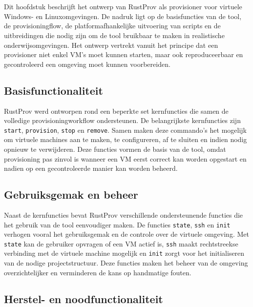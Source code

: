 \chapter{}%
\label{ch:ontwerp}

Dit hoofdstuk beschrijft het ontwerp van RustProv als provisioner voor virtuele Windows- en Linuxomgevingen. De nadruk ligt op de basisfuncties van de tool, de provisioningflow, de platformafhankelijke uitvoering van scripts en de uitbreidingen die nodig zijn om de tool bruikbaar te maken in realistische onderwijsomgevingen. Het ontwerp vertrekt vanuit het principe dat een provisioner niet enkel VM's moet kunnen starten, maar ook reproduceerbaar en gecontroleerd een omgeving moet kunnen voorbereiden. 
\section{Basisfunctionaliteit}

RustProv werd ontworpen rond een beperkte set kernfuncties die samen de volledige provisioningworkflow ondersteunen. De belangrijkste kernfuncties zijn \texttt{start}, \texttt{provision}, \texttt{stop} en \texttt{remove}. Samen maken deze commando's het mogelijk om virtuele machines aan te maken, te configureren, af te sluiten en indien nodig opnieuw te verwijderen. Deze functies vormen de basis van de tool, omdat provisioning pas zinvol is wanneer een VM eerst correct kan worden opgestart en nadien op een gecontroleerde manier kan worden beheerd.

\section{Gebruiksgemak en beheer}

Naast de kernfuncties bevat RustProv verschillende ondersteunende functies die het gebruik van de tool eenvoudiger maken. De functies \texttt{state}, \texttt{ssh} en \texttt{init} verhogen vooral het gebruiksgemak en de controle over de virtuele omgeving. Met \texttt{state} kan de gebruiker opvragen of een VM actief is, \texttt{ssh} maakt rechtstreekse verbinding met de virtuele machine mogelijk en \texttt{init} zorgt voor het initialiseren van de nodige projectstructuur. Deze functies maken het beheer van de omgeving overzichtelijker en verminderen de kans op handmatige fouten.

\section{Herstel- en noodfunctionaliteit}

